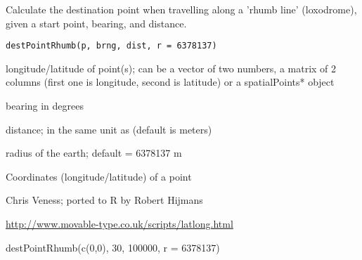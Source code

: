 \begin{Description}\relax
Calculate the destination point when travelling along a 'rhumb line' (loxodrome), given a start point, bearing, and distance.
\end{Description}
\begin{Usage}
\begin{verbatim}
destPointRhumb(p, brng, dist, r = 6378137)
\end{verbatim}
\end{Usage}
\begin{Arguments}
\begin{ldescription}
\item[\code{p}] longitude/latitude of point(s); can be a vector of two numbers, a matrix of 2 columns (first one is longitude, second is latitude) or a spatialPoints* object
\item[\code{brng}] bearing in degrees
\item[\code{dist}] distance; in the same unit as  (default is meters)
\item[\code{r}] radius of the earth; default = 6378137 m
\end{ldescription}
\end{Arguments}
\begin{Value}
Coordinates (longitude/latitude) of a point
\end{Value}
\begin{Author}\relax
Chris Veness; ported to R by Robert Hijmans
\end{Author}
\begin{References}\relax
\url{http://www.movable-type.co.uk/scripts/latlong.html}
\end{References}
\begin{SeeAlso}\relax
{}
\end{SeeAlso}
\begin{Examples}
\begin{ExampleCode}
destPointRhumb(c(0,0), 30, 100000, r = 6378137)
\end{ExampleCode}
\end{Examples}

